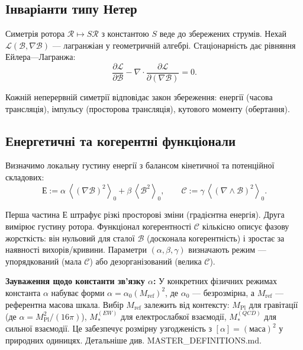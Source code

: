 \documentclass[11pt,a4paper]{article}
\newcommand{\grade}[2]{\left\langle #1 \right\rangle_{#2}}
\newcommand{\scal}[1]{\grade{#1}{0}}
\newcommand{\Rotor}{\mathcal{R}}
\newcommand{\Biv}{\mathcal{B}}
\newcommand{\D}{\nabla}                        %
\theoremstyle{definition}
\theoremstyle{plain}
\theoremstyle{remark}
\begin{document}
\subsection{Інваріанти типу Нетер}

Симетрія ротора $\Rotor\mapsto S\Rotor$ з константою $S$ веде до збережених струмів. Нехай $\mathcal{L}(\Biv,\D\Biv)$ — лагранжіан у геометричній алгебрі. Стаціонарність дає рівняння Ейлера—Лагранжа:
\begin{equation}
\frac{\partial \mathcal{L}}{\partial \Biv} - \D \cdot \frac{\partial \mathcal{L}}{\partial (\D\Biv)} = 0.
\end{equation}

Кожній неперервній симетрії відповідає закон збереження: енергії (часова трансляція), імпульсу (просторова трансляція), кутового моменту (обертання).

\subsection{Енергетичні та когерентні функціонали}

Визначимо локальну густину енергії з балансом кінетичної та потенційної складових:
\begin{equation}
  \mathcal{Е} := \alpha\, \scal{(\D \Biv)^2} + \beta\, \scal{\Biv^2},
  \qquad
  \mathcal{C} := \gamma\, \scal{(\D\wedge\Biv)^2}.
\end{equation}

Перша частина $\mathcal{Е}$ штрафує різкі просторові зміни (градієнтна енергія). Друга вимірює густину ротора. Функціонал когерентності $\mathcal{C}$ кількісно описує фазову жорсткість: він нульовий для сталої $\Biv$ (досконала когерентність) і зростає за наявності вихорів/кривини. Параметри $(\alpha,\beta,\gamma)$ визначають режим — упорядкований (мала $\mathcal{C}$) або дезорганізований (велика $\mathcal{C}$).

\textbf{Зауваження щодо константи зв'язку $\alpha$:} У конкретних фізичних режимах константа $\alpha$ набуває форми $\alpha = \alpha_0 (M_{\text{ref}})^2$, де $\alpha_0$ — безрозмірна, а $M_{\text{ref}}$ — референтна масова шкала. Вибір $M_{\text{ref}}$ залежить від контексту: $M_{\text{Pl}}$ для гравітації (де $\alpha = M_{\text{Pl}}^2/(16\pi)$), $M_*^{(EW)}$ для електрослабкої взаємодії, $M_*^{(QCD)}$ для сильної взаємодії. Це забезпечує розмірну узгодженість з $[\alpha] = (\text{маса})^2$ у природних одиницях. Детальніше див. MASTER\_DEFINITIONS.md.

\vspace{1em}
\end{document}
